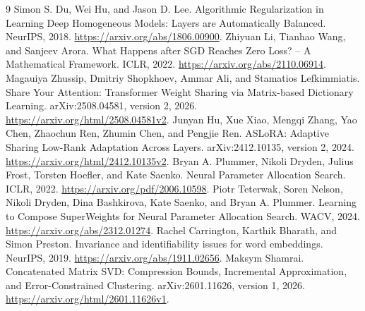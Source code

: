 \documentclass[11pt]{article}
\begin{document}
\begin{thebibliography}{9}
\setlength{\itemsep}{2pt}
 Simon S. Du, Wei Hu, and Jason D. Lee. Algorithmic Regularization in Learning Deep Homogeneous Models: Layers are Automatically Balanced. NeurIPS, 2018. \url{https://arxiv.org/abs/1806.00900}.
 Zhiyuan Li, Tianhao Wang, and Sanjeev Arora. What Happens after SGD Reaches Zero Loss? -- A Mathematical Framework. ICLR, 2022. \url{https://arxiv.org/abs/2110.06914}.
 Magauiya Zhussip, Dmitriy Shopkhoev, Ammar Ali, and Stamatios Lefkimmiatis. Share Your Attention: Transformer Weight Sharing via Matrix-based Dictionary Learning. arXiv:2508.04581, version 2, 2026. \url{https://arxiv.org/html/2508.04581v2}.
 Junyan Hu, Xue Xiao, Mengqi Zhang, Yao Chen, Zhaochun Ren, Zhumin Chen, and Pengjie Ren. ASLoRA: Adaptive Sharing Low-Rank Adaptation Across Layers. arXiv:2412.10135, version 2, 2024. \url{https://arxiv.org/html/2412.10135v2}.
 Bryan A. Plummer, Nikoli Dryden, Julius Frost, Torsten Hoefler, and Kate Saenko. Neural Parameter Allocation Search. ICLR, 2022. \url{https://arxiv.org/pdf/2006.10598}.
 Piotr Teterwak, Soren Nelson, Nikoli Dryden, Dina Bashkirova, Kate Saenko, and Bryan A. Plummer. Learning to Compose SuperWeights for Neural Parameter Allocation Search. WACV, 2024. \url{https://arxiv.org/abs/2312.01274}.
 Rachel Carrington, Karthik Bharath, and Simon Preston. Invariance and identifiability issues for word embeddings. NeurIPS, 2019. \url{https://arxiv.org/abs/1911.02656}.
 Maksym Shamrai. Concatenated Matrix SVD: Compression Bounds, Incremental Approximation, and Error-Constrained Clustering. arXiv:2601.11626, version 1, 2026. \url{https://arxiv.org/html/2601.11626v1}.
\end{thebibliography}
\endgroup
\end{document}
